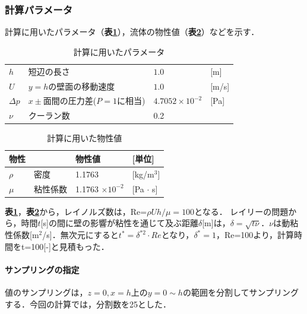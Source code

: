%
\subsubsection{計算パラメータ}

計算に用いたパラメータ（\textbf{表\ref{Table.2Dcouette_param}}），流体の物性値（\textbf{表\ref{Table.2Dcouette_bussei}}）などを示す．
\begin{table}[htbp]
\centering
\caption{計算に用いたパラメータ}
\label{Table.2Dcouette_param}
\begin{tabular}{llll}\toprule
$h$ &短辺の長さ &$1.0$ &[m]\\
$U$ &$y=h$の壁面の移動速度 & $1.0$ &[m/s]\\
$\Delta p$ &$x\pm$面間の圧力差($P=1$に相当) &$4.7052\times10^{-2}$ &[Pa]\\
$\nu $ & クーラン数 & 0.2& \\
\bottomrule
\end{tabular}
\end{table}

\begin{table}[htbp]
\centering
\caption{計算に用いた物性値}
\label{Table.2Dcouette_bussei}
\begin{tabular}{llll}\toprule
物性 &&物性値  & [単位]\\
\midrule
$\rho$ & 密度 & 1.1763 & [kg/m$^3$]\\
$\mu$  & 粘性係数 & 1.1763 $\times 10^{-2}$ &[Pa $\cdot$ s]\\
\bottomrule
\end{tabular}
\end{table}

\textbf{表\ref{Table.2Dcouette_param}}，\textbf{表\ref{Table.2Dcouette_bussei}}から，レイノルズ数は，Re=$\rho U h/\mu=100$となる．
レイリーの問題から，時間$t$[s]の間に壁の影響が粘性を通じて及ぶ距離$\delta$[m]は，$\delta=\sqrt{t\nu}$．$\nu$は動粘性係数[m$^2$/s]．無次元にすると$t^*=\delta^{*2}\cdot Re$となり，$\delta^*=1$，Re=100より，計算時間をt=100[-]と見積もった．

\paragraph{サンプリングの指定}
値のサンプリングは，$z=0, x=h$上の$y=0 \sim h$の範囲を分割してサンプリングする．今回の計算では，分割数を25とした．

